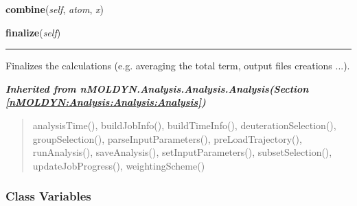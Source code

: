 \hspace{.8\funcindent}\begin{boxedminipage}{\funcwidth}

    \raggedright \textbf{combine}(\textit{self}, \textit{atom}, \textit{x})

\setlength{\parskip}{2ex}
\setlength{\parskip}{1ex}
    \end{boxedminipage}

    \label{nMOLDYN:Analysis:Dynamics:RadiusOfGyration:finalize}

    \vspace{0.5ex}

\hspace{.8\funcindent}\begin{boxedminipage}{\funcwidth}

    \raggedright \textbf{finalize}(\textit{self})

    \vspace{-1.5ex}

    \rule{\textwidth}{0.5\fboxrule}
\setlength{\parskip}{2ex}
    Finalizes the calculations (e.g. averaging the total term, output files
    creations ...).

\setlength{\parskip}{1ex}
    \end{boxedminipage}


\large{\textbf{\textit{Inherited from nMOLDYN.Analysis.Analysis.Analysis\textit{(Section \ref{nMOLDYN:Analysis:Analysis:Analysis})}}}}

\begin{quote}
analysisTime(), buildJobInfo(), buildTimeInfo(), deuterationSelection(), groupSelection(), parseInputParameters(), preLoadTrajectory(), runAnalysis(), saveAnalysis(), setInputParameters(), subsetSelection(), updateJobProgress(), weightingScheme()
\end{quote}


  \subsubsection{Class Variables}

